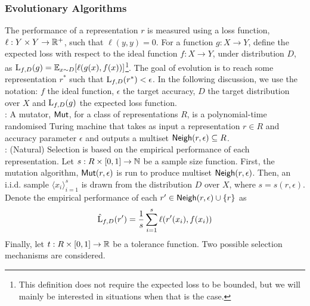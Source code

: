 \subsubsection*{Evolutionary Algorithms}

The performance of a representation $r$ is measured using a loss function, $\ell
: Y \times Y \rightarrow \mathbb{R}^+$, such that $\ell(y, y) = 0$. For a function
$g : X \rightarrow Y$, define the expected loss with respect to the ideal
function $f : X \rightarrow Y$, under distribution $D$, as $\mathrm{L}_{f, D}(g) =
\mathbb{E}_{x \sim D}[\ell(g(x), f(x))]$\footnote{This definition does not require the
expected loss to be bounded, but we will mainly be interested in situations when
that is the case.}. The goal of evolution is to reach some representation $r^*$
such that $\mathrm{L}_{f, D}(r^*) < \epsilon$. In the following discussion, we use
the notation: $f$ the ideal function, $\epsilon$ the target accuracy, $D$ the
target distribution over $X$ and $\mathrm{L}_{f, D}(g)$ the expected loss function.  \medskip \\
%
: A mutator, $\mathsf{Mut}$, for a class of representations $R$,
is a polynomial-time randomised Turing machine that takes as input a
representation $r \in R$ and accuracy parameter $\epsilon$ and outputs a
multiset $\mathsf{Neigh}(r, \epsilon) \subseteq R$. \medskip \\
%
: (Natural) Selection is based on the empirical performance
of each representation. Let $s : R \times [0, 1] \rightarrow \mathbb{N}$ be a
sample size function. First, the mutation algorithm, $\mathsf{Mut}(r, \epsilon)$ is run
to produce multiset $\mathsf{Neigh}(r, \epsilon)$. Then, an i.i.d. sample $\langle x_i
\rangle_{i=1}^s$ is drawn from the distribution $D$ over $X$, where $s = s(r,
\epsilon)$.  Denote the empirical performance of each $r^\prime \in \mathsf{Neigh}(r,
\epsilon) \cup \{r \}$ as
%
\[ \hat{\mathrm{L}}_{f, D}(r^\prime) = \frac{1}{s}\sum_{i=1}^s \ell(r^\prime(x_i),
f(x_i)) \]
%
Finally, let $t : R \times [0, 1] \rightarrow \mathbb{R}$ be a tolerance function.
Two possible selection mechanisms are considered.
